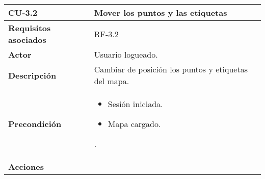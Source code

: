 \begin{longtable}[H]{@{}l|l@{}}
	\toprule
	\begin{minipage}[b]{0.23\columnwidth}\raggedright\strut
		\textbf{CU-3.2}\strut
	\end{minipage} & \begin{minipage}[b]{0.71\columnwidth}\raggedright\strut
		\textbf{Mover los puntos y las etiquetas}\strut
	\end{minipage}\tabularnewline
	\toprule
	\endhead
	\begin{minipage}[t]{0.23\columnwidth}\raggedright\strut
		\textbf{Requisitos asociados}\strut
	\end{minipage} & \begin{minipage}[t]{0.71\columnwidth}\raggedright\strut
		RF-3.2\strut
	\end{minipage}\tabularnewline
	\midrule
	\begin{minipage}[t]{0.23\columnwidth}\raggedright\strut
		\textbf{Actor}\strut
	\end{minipage} & \begin{minipage}[t]{0.71\columnwidth}\raggedright\strut
		Usuario logueado.\strut
	\end{minipage}\tabularnewline
	\midrule
	\begin{minipage}[t]{0.23\columnwidth}\raggedright\strut
		\textbf{Descripción}\strut
	\end{minipage} & \begin{minipage}[t]{0.71\columnwidth}\raggedright\strut
		Cambiar de posición los puntos y etiquetas del mapa.\strut
	\end{minipage}\tabularnewline
	\midrule
	\begin{minipage}[t]{0.23\columnwidth}\raggedright\strut
		\textbf{Precondición}\strut
	\end{minipage} & \begin{minipage}[t]{0.71\columnwidth}\raggedright
		\begin{itemize}
			\item Sesión iniciada.
			\item Mapa cargado.
		\end{itemize}.
	\end{minipage}\tabularnewline
	\midrule
	\begin{minipage}[t]{0.23\columnwidth}\raggedright\strut
		\textbf{Acciones}\strut
	\end{minipage} & \begin{minipage}[t]{0.71\columnwidth}\raggedright
		\begin{enumerate}

\end{enumerate}
\end{minipage}
\end{longtable}
